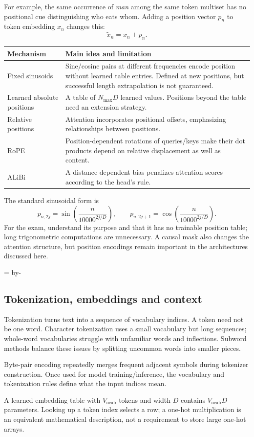 \documentclass[11pt]{article}
\newcommand{\newsubsection}[1]{\par\begingroup\skip0=\pagegoal\advance\skip0 by-\pagetotal\ifdim\skip0<12\baselineskip\newpage\fi\endgroup\subsection{#1}}
\begin{document}
For example, the same occurrence of \emph{man} among the same token multiset has no positional cue distinguishing who eats whom. Adding a position vector $p_n$ to token embedding $x_n$ changes this:
\[
\widetilde{x}_n=x_n+p_n.
\]
\begin{longtable}{@{}P{.24\textwidth}P{.66\textwidth}@{}}
\toprule Mechanism & Main idea and limitation\\\midrule\endhead
Fixed sinusoids & Sine/cosine pairs at different frequencies encode position without learned table entries. Defined at new positions, but successful length extrapolation is not guaranteed.\\
Learned absolute positions & A table of $N_{\max}D$ learned values. Positions beyond the table need an extension strategy.\\
Relative positions & Attention incorporates positional offsets, emphasizing relationships between positions.\\
RoPE & Position-dependent rotations of queries/keys make their dot products depend on relative displacement as well as content.\\
ALiBi & A distance-dependent bias penalizes attention scores according to the head's rule.\\\bottomrule
\end{longtable}
The standard sinusoidal form is
\[
p_{n,2j}=\sin\!\left(\frac{n}{10000^{2j/D}}\right),\qquad
p_{n,2j+1}=\cos\!\left(\frac{n}{10000^{2j/D}}\right).
\]
For the exam, understand its purpose and that it has no trainable position table; long trigonometric computations are unnecessary. A causal mask also changes the attention structure, but position encodings remain important in the architectures discussed here.

\newsubsection{Tokenization, embeddings and context}
Tokenization turns text into a sequence of vocabulary indices. A token need not be one word. Character tokenization uses a small vocabulary but long sequences; whole-word vocabularies struggle with unfamiliar words and inflections. Subword methods balance these issues by splitting uncommon words into smaller pieces.

Byte-pair encoding repeatedly merges frequent adjacent symbols during tokenizer construction. Once used for model training/inference, the vocabulary and tokenization rules define what the input indices mean.

A learned embedding table with $V_{\mathrm{ocab}}$ tokens and width $D$ contains $V_{\mathrm{ocab}}D$ parameters. Looking up a token index selects a row; a one-hot multiplication is an equivalent mathematical description, not a requirement to store large one-hot arrays.
\end{document}
